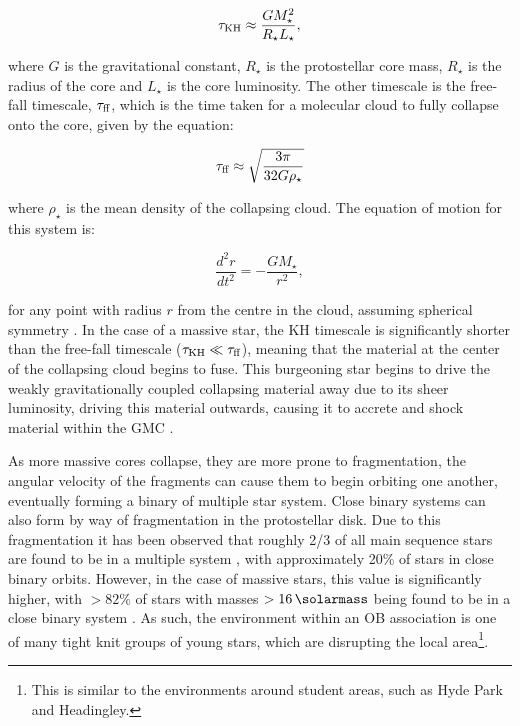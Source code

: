 \begin{equation}
  \label{eq:khtime}
  \tau_\text{KH} \approx \frac{G M_\star^2}{R_\star L_\star},  
\end{equation}

\noindent
where $G$ is the gravitational constant, $R_\star$ is the protostellar core mass, $R_\star$ is the radius of the core and $L_\star$ is the core luminosity.
The other timescale is the free-fall timescale, $\tau_\text{ff}$, which is the time taken for a molecular cloud to fully collapse onto the core, given by the equation:

\begin{equation}
  \label{eq:fftime}
  \tau_\text{ff} \approx \sqrt{\frac{3\pi}{32 G \rho_\star}}
\end{equation}

\noindent
where $\rho_\star$ is the mean density of the collapsing cloud.
The equation of motion for this system is:

\begin{equation}
  \frac{d^2r}{dt^2} = - \frac{GM_\star}{r^2} ,
\end{equation}

\noindent
for any point with radius $r$ from the centre in the cloud, assuming spherical symmetry \parencite[96]{ward-thompsonIntroductionStarFormation2011}.
In the case of a massive star, the KH timescale is significantly shorter than the free-fall timescale ($\tau_\text{KH} \ll \tau_\text{ff}$), meaning that the material at the center of the collapsing cloud begins to fuse.
This burgeoning star begins to drive the weakly gravitationally coupled collapsing material away due to its sheer luminosity, driving this material outwards, causing it to accrete and shock material within the GMC \parencite[Ch.~5]{bodenheimerPrinciplesStarFormation2011}. 

As more massive cores collapse, they are more prone to fragmentation, the angular velocity of the fragments can cause them to begin orbiting one another, eventually forming a binary of multiple star system.
Close binary systems can also form by way of fragmentation in the protostellar disk.
Due to this fragmentation it has been observed that roughly 2/3 of all main sequence stars are found to be in a multiple system \parencite[113]{ward-thompsonIntroductionStarFormation2011}, with approximately 20\% of stars in close binary orbits.
However, in the case of massive stars, this value is significantly higher, with $>82\%$ of stars with masses $>\SI{16}{\solarmass}$ being found to be in a close binary system \parencite{chiniSpectroscopicSurveyMultiplicity2012}.
As such, the environment within an OB association is one of many tight knit groups of young stars, which are disrupting the local area\footnote{This is similar to the environments around student areas, such as Hyde Park and Headingley.}.

